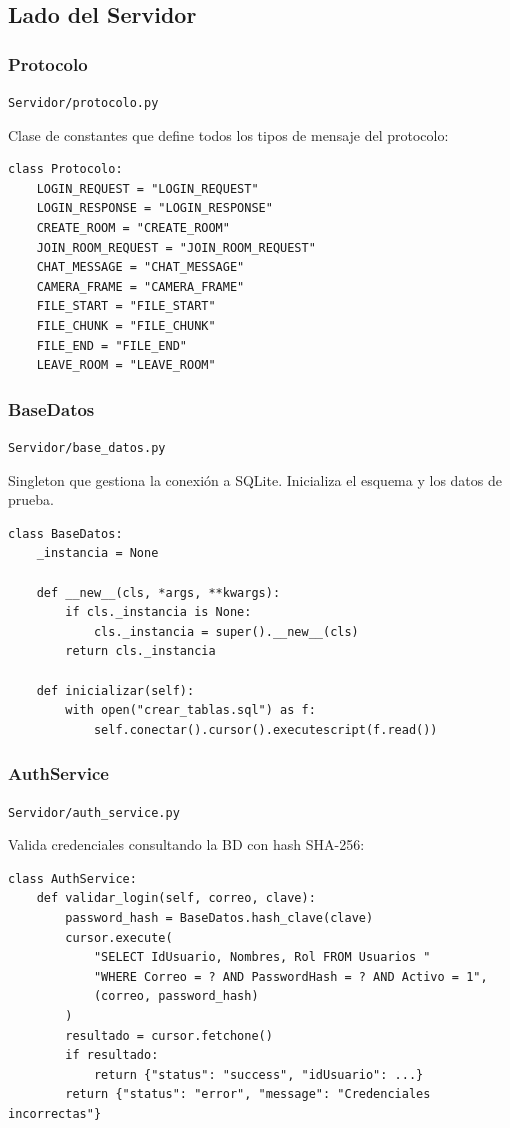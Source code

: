 \documentclass[12pt,a4paper]{article}
\begin{document}
\subsection{Lado del Servidor}

\subsubsection{Protocolo}
\texttt{Servidor/protocolo.py}

Clase de constantes que define todos los tipos de mensaje del protocolo:

\begin{lstlisting}
class Protocolo:
    LOGIN_REQUEST = "LOGIN_REQUEST"
    LOGIN_RESPONSE = "LOGIN_RESPONSE"
    CREATE_ROOM = "CREATE_ROOM"
    JOIN_ROOM_REQUEST = "JOIN_ROOM_REQUEST"
    CHAT_MESSAGE = "CHAT_MESSAGE"
    CAMERA_FRAME = "CAMERA_FRAME"
    FILE_START = "FILE_START"
    FILE_CHUNK = "FILE_CHUNK"
    FILE_END = "FILE_END"
    LEAVE_ROOM = "LEAVE_ROOM"
\end{lstlisting}

\subsubsection{BaseDatos}
\texttt{Servidor/base\_datos.py}

Singleton que gestiona la conexi\'on a SQLite. Inicializa el esquema y los datos de prueba.

\begin{lstlisting}
class BaseDatos:
    _instancia = None

    def __new__(cls, *args, **kwargs):
        if cls._instancia is None:
            cls._instancia = super().__new__(cls)
        return cls._instancia

    def inicializar(self):
        with open("crear_tablas.sql") as f:
            self.conectar().cursor().executescript(f.read())
\end{lstlisting}

\subsubsection{AuthService}
\texttt{Servidor/auth\_service.py}

Valida credenciales consultando la BD con hash SHA-256:

\begin{lstlisting}
class AuthService:
    def validar_login(self, correo, clave):
        password_hash = BaseDatos.hash_clave(clave)
        cursor.execute(
            "SELECT IdUsuario, Nombres, Rol FROM Usuarios "
            "WHERE Correo = ? AND PasswordHash = ? AND Activo = 1",
            (correo, password_hash)
        )
        resultado = cursor.fetchone()
        if resultado:
            return {"status": "success", "idUsuario": ...}
        return {"status": "error", "message": "Credenciales incorrectas"}
\end{lstlisting}
\end{document}
